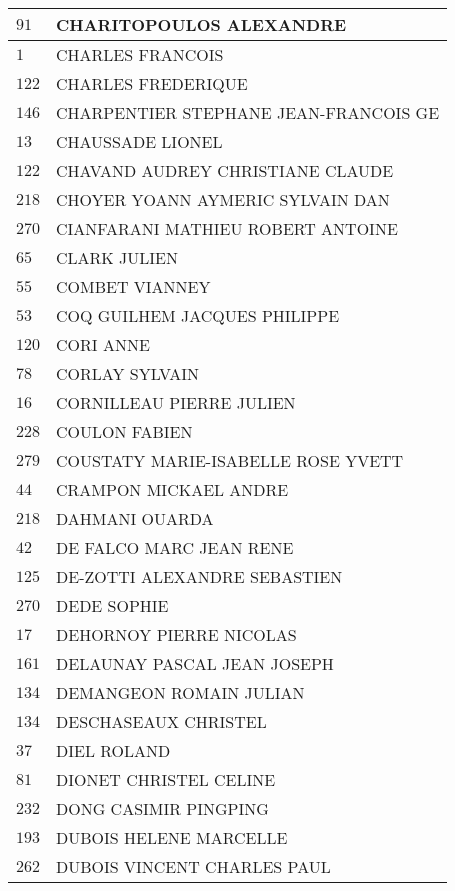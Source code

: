 \begin{xltabular}{\linewidth}{|l|X|}
    \hline
    $91$ & CHARITOPOULOS ALEXANDRE \\
    \hline
    $1$ & CHARLES FRANCOIS \\
    \hline
    $122$ & CHARLES FREDERIQUE \\
    \hline
    $146$ & CHARPENTIER STEPHANE JEAN-FRANCOIS GE \\
    \hline
    $13$ & CHAUSSADE LIONEL \\
    \hline
    $122$ & CHAVAND AUDREY CHRISTIANE CLAUDE \\
    \hline
    $218$ & CHOYER YOANN AYMERIC SYLVAIN DAN \\
    \hline
    $270$ & CIANFARANI MATHIEU ROBERT ANTOINE \\
    \hline
    $65$ & CLARK JULIEN \\
    \hline
    $55$ & COMBET VIANNEY \\
    \hline
    $53$ & COQ GUILHEM JACQUES PHILIPPE \\
    \hline
    $120$ & CORI ANNE \\
    \hline
    $78$ & CORLAY SYLVAIN \\
    \hline
    $16$ & CORNILLEAU PIERRE JULIEN \\
    \hline
    $228$ & COULON FABIEN \\
    \hline
    $279$ & COUSTATY MARIE-ISABELLE ROSE YVETT \\
    \hline
    $44$ & CRAMPON MICKAEL ANDRE \\
    \hline
    $218$ & DAHMANI OUARDA \\
    \hline
    $42$ & DE FALCO MARC JEAN RENE \\
    \hline
    $125$ & DE-ZOTTI ALEXANDRE SEBASTIEN \\
    \hline
    $270$ & DEDE SOPHIE \\
    \hline
    $17$ & DEHORNOY PIERRE NICOLAS \\
    \hline
    $161$ & DELAUNAY PASCAL JEAN JOSEPH \\
    \hline
    $134$ & DEMANGEON ROMAIN JULIAN \\
    \hline
    $134$ & DESCHASEAUX CHRISTEL \\
    \hline
    $37$ & DIEL ROLAND \\
    \hline
    $81$ & DIONET CHRISTEL CELINE \\
    \hline
    $232$ & DONG CASIMIR PINGPING \\
    \hline
    $193$ & DUBOIS HELENE MARCELLE \\
    \hline
    $262$ & DUBOIS VINCENT CHARLES PAUL \\

\end{xltabular}
